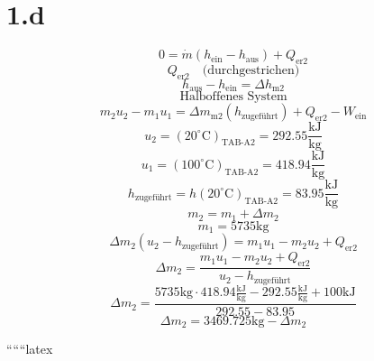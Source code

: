 \section*{1.d}
\[
0 = \dot{m} \left( h_{\text{ein}} - h_{\text{aus}} \right) + Q_{\text{er2}}
\]
\[
Q_{\text{er2}} \quad \text{(durchgestrichen)}
\]
\[
h_{\text{aus}} - h_{\text{ein}} = \Delta h_{\text{m2}}
\]
\[
\text{Halboffenes System}
\]
\[
m_2 u_2 - m_1 u_1 = \Delta m_{\text{m2}} \left( h_{\text{zugeführt}} \right) + Q_{\text{er2}} - W_{\text{ein}}
\]
\[
u_2 = \left( 20^\circ \text{C} \right)_{\text{TAB-A2}} = 292.55 \frac{\text{kJ}}{\text{kg}}
\]
\[
u_1 = \left( 100^\circ \text{C} \right)_{\text{TAB-A2}} = 418.94 \frac{\text{kJ}}{\text{kg}}
\]
\[
h_{\text{zugeführt}} = h \left( 20^\circ \text{C} \right)_{\text{TAB-A2}} = 83.95 \frac{\text{kJ}}{\text{kg}}
\]
\[
m_2 = m_1 + \Delta m_2
\]
\[
m_1 = 5735 \text{kg}
\]
\[
\Delta m_2 \left( u_2 - h_{\text{zugeführt}} \right) = m_1 u_1 - m_2 u_2 + Q_{\text{er2}}
\]
\[
\Delta m_2 = \frac{m_1 u_1 - m_2 u_2 + Q_{\text{er2}}}{u_2 - h_{\text{zugeführt}}}
\]
\[
\Delta m_2 = \frac{5735 \text{kg} \cdot 418.94 \frac{\text{kJ}}{\text{kg}} - 292.55 \frac{\text{kJ}}{\text{kg}} + 100 \text{kJ}}{292.55 - 83.95}
\]
\[
\Delta m_2 = 3469.725 \text{kg} - \Delta m_2
\]

``````latex